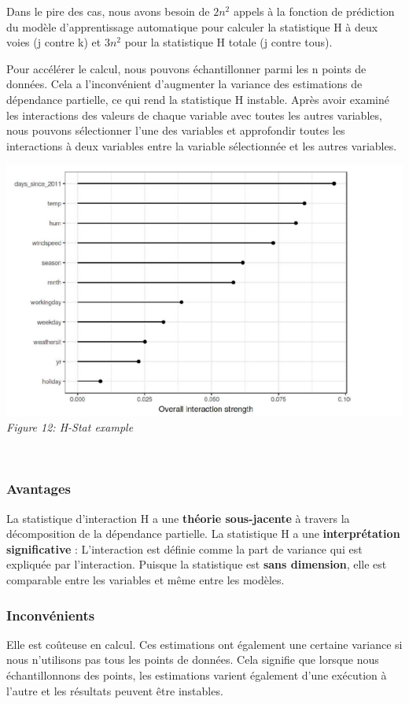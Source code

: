 Dans le pire des cas, nous avons besoin de \(2n^2\) appels à la fonction de prédiction du modèle d'apprentissage automatique pour calculer la statistique H à deux voies (j contre k) et \(3n^2\) pour la statistique H totale (j contre tous).

Pour accélérer le calcul, nous pouvons échantillonner parmi les n points de données. Cela a l'inconvénient d'augmenter la variance des estimations de dépendance partielle, ce qui rend la statistique H instable. Après avoir examiné les interactions des valeurs de chaque variable avec toutes les autres variables, nous pouvons sélectionner l'une des variables et approfondir toutes les interactions à deux variables entre la variable sélectionnée et les autres variables.

\begin{center}
    \centering
    \includegraphics[width=0.7\linewidth]{Images/h_stat.png}
    \\
    \emph{Figure 12: H-Stat example}
    \\
\end{center}
\\


\subsubsection{Avantages}
La statistique d'interaction H a une \textbf{théorie sous-jacente} à travers la décomposition de la dépendance partielle.
La statistique H a une \textbf{interprétation significative} :
L'interaction est définie comme la part de variance qui est expliquée par l'interaction.
Puisque la statistique est \textbf{sans dimension}, elle est comparable entre les variables et même entre les modèles.

\subsubsection{Inconvénients}
Elle est coûteuse en calcul.
Ces estimations ont également une certaine variance si nous n'utilisons pas tous les points de données. Cela signifie que lorsque nous échantillonnons des points, les estimations varient également d'une exécution à l'autre et les résultats peuvent être instables.

